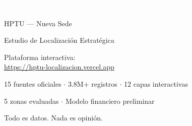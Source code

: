 \documentclass[aspectratio=169, 11pt]{beamer}
\begin{document}
{
\begin{frame}[plain]
\vfill
\begin{center}
{\Huge\bfseries\textcolor{white}{¿Preguntas?}}

\vspace{20pt}

\vspace{16pt}
{\large\textcolor{white!90}{HPTU — Nueva Sede}}

\vspace{6pt}
{\normalsize\textcolor{white!80}{Estudio de Localización Estratégica}}

\vspace{14pt}
{\small\textcolor{white!70}{Plataforma interactiva:}}\\
{\small\textcolor{white!90}{\url{https://hptu-localizacion.vercel.app}}}

\vspace{10pt}
{\small\textcolor{white!60}{15 fuentes oficiales $\cdot$ 3.8M+ registros $\cdot$ 12 capas interactivas}}

\vspace{6pt}
{\small\textcolor{white!60}{5 zonas evaluadas $\cdot$ Modelo financiero preliminar}}

\vspace{20pt}
{\footnotesize\textcolor{white!40}{Todo es datos. Nada es opinión.}}
\end{center}
\vfill
\end{frame}
}
\end{document}
